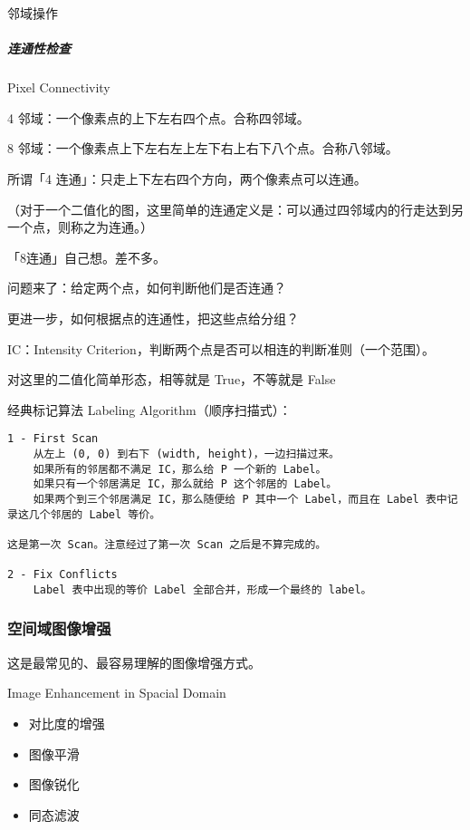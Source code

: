 \documentclass[
]{article}
\begin{document}
邻域操作

\hypertarget{header-n91}{%
\subparagraph{连通性检查}\label{header-n91}}

Pixel Connectivity

4 邻域：一个像素点的上下左右四个点。合称四邻域。

8 邻域：一个像素点上下左右左上左下右上右下八个点。合称八邻域。

所谓「4 连通」：只走上下左右四个方向，两个像素点可以连通。

（对于一个二值化的图，这里简单的连通定义是：可以通过四邻域内的行走达到另一个点，则称之为连通。）

「8连通」自己想。差不多。

问题来了：给定两个点，如何判断他们是否连通？

更进一步，如何根据点的连通性，把这些点给分组？

IC：Intensity Criterion，判断两个点是否可以相连的判断准则（一个范围）。

对这里的二值化简单形态，相等就是 True，不等就是 False

经典标记算法 Labeling Algorithm（顺序扫描式）：

\begin{verbatim}
1 - First Scan
    从左上 (0, 0) 到右下 (width, height)，一边扫描过来。
    如果所有的邻居都不满足 IC，那么给 P 一个新的 Label。
    如果只有一个邻居满足 IC，那么就给 P 这个邻居的 Label。
    如果两个到三个邻居满足 IC，那么随便给 P 其中一个 Label，而且在 Label 表中记录这几个邻居的 Label 等价。
    
这是第一次 Scan。注意经过了第一次 Scan 之后是不算完成的。

2 - Fix Conflicts
    Label 表中出现的等价 Label 全部合并，形成一个最终的 label。
\end{verbatim}

\hypertarget{header-n104}{%
\subsubsection{空间域图像增强}\label{header-n104}}

这是最常见的、最容易理解的图像增强方式。

Image Enhancement in Spacial Domain

\begin{itemize}
\item
  对比度的增强
\item
  图像平滑
\item
  图像锐化
\item
  同态滤波
\end{itemize}
\end{document}
